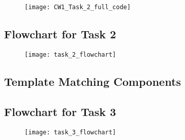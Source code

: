 \documentclass[conference]{IEEEtran}
\begin{document}
\begin{appendix}
\begin{figure}[H]
\centerline{\texttt{[image: CW1\_Task\_2\_full\_code]}}
\end{figure}

\label{appendix:task_2_full_code}

\subsection{Flowchart for Task 2}

\begin{figure}[H]
\centerline{\texttt{[image: task\_2\_flowchart]}}
\end{figure}

\label{appendix:task_2_flowchart}

\subsection{Template Matching Components}

\begin{figure}[H]
\centering
{}
\end{figure}

\label{appendix:template_matching_components}

\subsection{Flowchart for Task 3}

\begin{figure}[H]
\centerline{\texttt{[image: task\_3\_flowchart]}}
\end{figure}

\label{appendix:task_3_flowchart}


\end{appendix}
\end{document}
